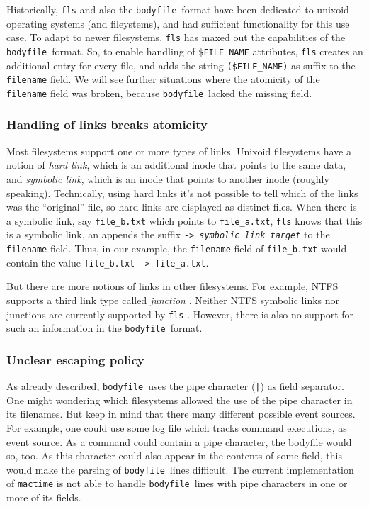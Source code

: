 \documentclass[twocolumn]{article}
\newcommand{\bodyfile}{\texttt{bodyfile}}
\begin{document}
Historically, \texttt{fls} and also the \bodyfile\ format have been dedicated to unixoid operating systems (and fileystems), and had sufficient functionality for this use case. To adapt to newer filesystems, \texttt{fls} has maxed out the capabilities of the \bodyfile\ format. So, to enable handling of \texttt{\$FILE\_NAME} attributes, \texttt{fls} creates an additional entry for every file, and adds the string \lstinline[style=inline]!($FILE_NAME)! as suffix to the \texttt{filename} field. We will see further situations where the atomicity of the \texttt{filename} field was broken, because \bodyfile\ lacked the missing field.

\subsubsection{Handling of links breaks atomicity}

Most filesystems support one or more types of links. Unixoid filesystems have a notion of \emph{hard link}, which is an additional inode that points to the same data, and \emph{symbolic link}, which is an inode that points to another inode (roughly speaking). Technically, using hard links it's not possible to tell which of the links was the \enquote{original} file, so hard links are displayed as distinct files. When there is a symbolic link, say \lstinline[style=inline]!file_b.txt! which points to \lstinline[style=inline]!file_a.txt!, \texttt{fls} knows that this is a symbolic link, an appends the suffix \texttt{\hbox{->} \emph{symbolic\_link\_target}} to the \texttt{filename} field. Thus, in our example, the \texttt{filename} field of \lstinline[style=inline]!file_b.txt! would contain the value \lstinline[style=inline]!file_b.txt -> file_a.txt!.

But there are more notions of links in other filesystems. For example, NTFS supports a third link type called \emph{junction} \citep{HardLinksAndJunctions}. Neither NTFS symbolic links nor junctions are currently supported by \texttt{fls} \citep{sleuthit-2645}. However, there is also no support for such an information in the \bodyfile\ format.

\subsubsection{Unclear escaping policy}

As already described, \bodyfile\ uses the pipe character (\texttt{|}) as field separator. One might wondering which filesystems allowed the use of the pipe character in its filenames. But keep in mind that there many different possible event sources. For example, one could use some log file which tracks command executions, as event source. As a command could contain a pipe character, the bodyfile would so, too. As this character could also appear in the contents of some field, this would make the parsing of \bodyfile\ lines difficult. The current implementation of \texttt{mactime} is not able to handle \bodyfile\ lines with pipe characters in one or more of its fields.



\end{document}
